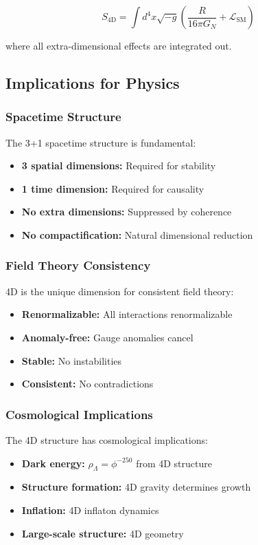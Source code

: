 \documentclass[11pt]{article}
\theoremstyle{definition}
\newcommand{\goldenratio}{\phi}
\begin{document}
\begin{equation}
S_{\text{4D}} = \int d^4x \sqrt{-g} \left(\frac{R}{16\pi G_N} + \mathcal{L}_{\text{SM}}\right)
\end{equation}

where all extra-dimensional effects are integrated out.

\subsection{Implications for Physics}

\subsubsection{Spacetime Structure}

The 3+1 spacetime structure is fundamental:
\begin{itemize}
\item \textbf{3 spatial dimensions:} Required for stability
\item \textbf{1 time dimension:} Required for causality
\item \textbf{No extra dimensions:} Suppressed by coherence
\item \textbf{No compactification:} Natural dimensional reduction
\end{itemize}

\subsubsection{Field Theory Consistency}

4D is the unique dimension for consistent field theory:
\begin{itemize}
\item \textbf{Renormalizable:} All interactions renormalizable
\item \textbf{Anomaly-free:} Gauge anomalies cancel
\item \textbf{Stable:} No instabilities
\item \textbf{Consistent:} No contradictions
\end{itemize}

\subsubsection{Cosmological Implications}

The 4D structure has cosmological implications:
\begin{itemize}
\item \textbf{Dark energy:} $\rho_\Lambda = \goldenratio^{-250}$ from 4D structure
\item \textbf{Structure formation:} 4D gravity determines growth
\item \textbf{Inflation:} 4D inflaton dynamics
\item \textbf{Large-scale structure:} 4D geometry
\end{itemize}
\end{document}
